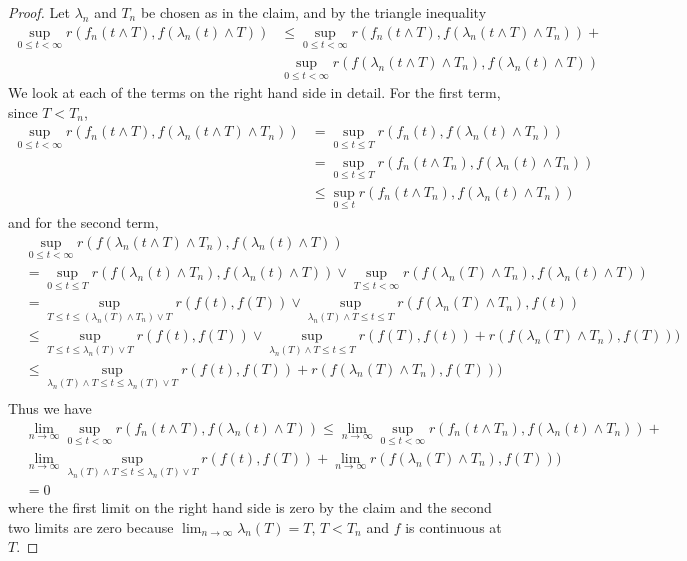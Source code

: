 \begin{proof}
Let $\lambda_n$ and $T_n$ be chosen as in the claim, and by the triangle inequality
\begin{align*}
\sup_{0 \leq t < \infty} r(f_n(t \wedge T), f(\lambda_n(t) \wedge T)) 
&\leq \sup_{0 \leq t < \infty} r(f_n(t \wedge T), f(\lambda_n(t \wedge T) \wedge T_n)) +\\
&\sup_{0 \leq t < \infty} r(f(\lambda_n(t \wedge T) \wedge T_n), f(\lambda_n(t) \wedge T)) 
\end{align*}
We look at each of the terms on the right hand side in detail.  For the first term, since $T < T_n$,
\begin{align*}
\sup_{0 \leq t < \infty} r(f_n(t \wedge T), f(\lambda_n(t \wedge T) \wedge T_n))
&=\sup_{0 \leq t \leq T} r(f_n(t), f(\lambda_n(t) \wedge T_n)) \\
&=\sup_{0 \leq t \leq T} r(f_n(t \wedge T_n), f(\lambda_n(t) \wedge T_n))  \\
&\leq \sup_{0 \leq t} r(f_n(t \wedge T_n), f(\lambda_n(t) \wedge T_n))
\end{align*}
and for the second term, 
\begin{align*}
&\sup_{0 \leq t < \infty} r(f(\lambda_n(t \wedge T) \wedge T_n), f(\lambda_n(t) \wedge T))  \\
&=\sup_{0 \leq t \leq T} r(f(\lambda_n(t) \wedge T_n), f(\lambda_n(t) \wedge T))  \vee
\sup_{T \leq t < \infty} r(f(\lambda_n(T) \wedge T_n), f(\lambda_n(t) \wedge T))  \\
&=\sup_{T \leq t \leq (\lambda_n(T) \wedge T_n) \vee T} r(f(t), f(T))  \vee
\sup_{\lambda_n(T) \wedge T \leq t \leq T} r(f(\lambda_n(T) \wedge T_n), f(t))  \\
&\leq \sup_{T \leq t \leq \lambda_n(T) \vee T} r(f(t), f(T))  \vee
\sup_{\lambda_n(T) \wedge T \leq t \leq T} r(f(T), f(t))  + 
r(f(\lambda_n(T) \wedge T_n), f(T)))\\
&\leq \sup_{\lambda_n(T) \wedge T\leq t \leq \lambda_n(T) \vee T} r(f(t), f(T)) + 
r(f(\lambda_n(T) \wedge T_n), f(T)))\\
\end{align*}
Thus we have 
\begin{align*}
&\lim_{n \to \infty} \sup_{0 \leq t < \infty} r(f_n(t \wedge T), f(\lambda_n(t) \wedge T)) 
\leq \lim_{n \to \infty} \sup_{0 \leq t < \infty} r(f_n(t \wedge T_n), f(\lambda_n(t) \wedge T_n)) + \\
&\lim_{n \to \infty} \sup_{\lambda_n(T) \wedge T\leq t \leq \lambda_n(T) \vee T} r(f(t), f(T)) + 
\lim_{n \to \infty} r(f(\lambda_n(T) \wedge T_n), f(T))) \\
&=0
\end{align*}
where the first limit on the right hand side is zero by the claim and the second two limits are zero
because $\lim_{n \to \infty} \lambda_n(T) = T$, $T < T_n$ and $f$ is continuous at $T$.
\end{proof}


